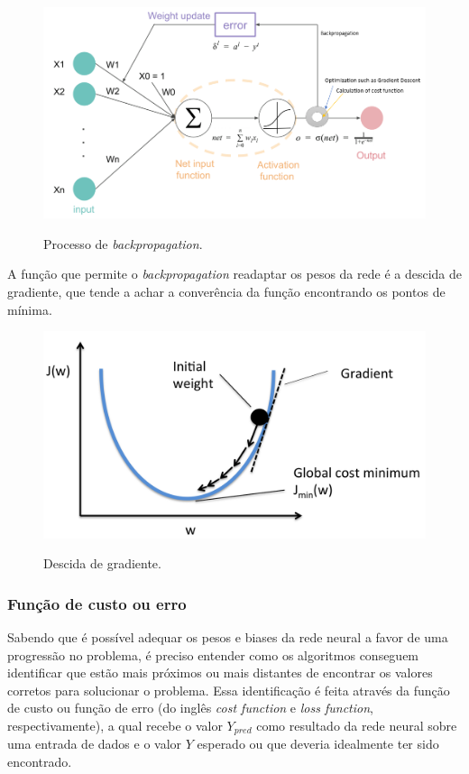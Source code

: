 \begin{figure}[H]
  \centering
  \caption{Processo de \textit{backpropagation}.}
  \includegraphics[scale=0.4]{figuras/backprop.png}
  \label{fig:backprop}
\end{figure}

A função que permite o \textit{backpropagation} readaptar os pesos da rede é a descida de gradiente, que tende a achar a converência da função encontrando os pontos de mínima.

\begin{figure}[H]
  \centering
  \caption{Descida de gradiente.}
  \includegraphics[scale=0.15]{figuras/gradient-descent.png}
  \label{fig:gradient-descent}
\end{figure}


\subsubsection{Função de custo ou erro} \label{sssec:cost-function}

Sabendo que é possível adequar os pesos e biases da rede neural a favor de uma progressão no problema, é preciso entender como os algoritmos conseguem identificar que estão mais próximos ou mais distantes de encontrar os valores corretos para solucionar o problema. Essa identificação é feita através da função de custo ou função de erro (do inglês \textit{cost function} e \textit{loss function}, respectivamente), a qual recebe o valor $Y_{pred}$ como resultado da rede neural sobre uma entrada de dados e o valor $Y$ esperado ou que deveria idealmente ter sido encontrado.

